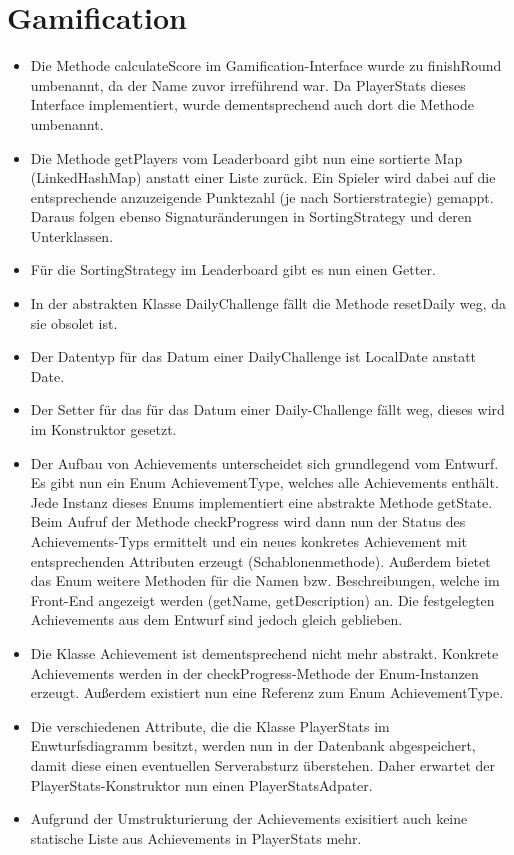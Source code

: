 \documentclass[a4paper]{scrreprt}
\begin{document}
\section{Gamification}
\begin{itemize}
  \item Die Methode calculateScore im Gamification-Interface wurde zu finishRound umbenannt, da der Name zuvor irreführend war. Da PlayerStats dieses Interface implementiert, wurde dementsprechend auch dort die Methode umbenannt.
  \item Die Methode getPlayers vom Leaderboard gibt nun eine sortierte Map (LinkedHashMap) anstatt einer Liste zurück. Ein Spieler wird dabei auf die entsprechende anzuzeigende Punktezahl (je nach Sortierstrategie) gemappt. Daraus folgen ebenso Signaturänderungen in SortingStrategy und deren Unterklassen.
  \item Für die SortingStrategy im Leaderboard gibt es nun einen Getter.
  \item In der abstrakten Klasse DailyChallenge fällt die Methode resetDaily weg, da sie obsolet ist.
  \item Der Datentyp für das Datum einer DailyChallenge ist LocalDate anstatt Date.
  \item Der Setter für das für das Datum einer Daily-Challenge fällt weg, dieses wird im Konstruktor gesetzt.
  \item Der Aufbau von Achievements unterscheidet sich grundlegend vom Entwurf. Es gibt nun ein Enum AchievementType, welches alle Achievements
    enthält. Jede Instanz dieses Enums implementiert eine abstrakte Methode getState. Beim Aufruf der Methode checkProgress
    wird dann nun der Status des Achievements-Typs ermittelt und ein neues konkretes Achievement mit entsprechenden Attributen
    erzeugt (Schablonenmethode). Außerdem bietet das Enum weitere Methoden für die Namen bzw. Beschreibungen, welche im Front-End
    angezeigt werden (getName, getDescription) an. Die festgelegten Achievements aus dem Entwurf sind jedoch gleich geblieben.
  \item Die Klasse Achievement ist dementsprechend nicht mehr abstrakt. Konkrete Achievements werden in der checkProgress-Methode
    der Enum-Instanzen erzeugt. Außerdem existiert nun eine Referenz zum Enum AchievementType.
  \item Die verschiedenen Attribute, die die Klasse PlayerStats im Enwturfsdiagramm besitzt, werden nun in der Datenbank abgespeichert, damit diese
    einen eventuellen Serverabsturz überstehen. Daher erwartet der PlayerStats-Konstruktor nun einen PlayerStatsAdpater.
  \item Aufgrund der Umstrukturierung der Achievements exisitiert auch keine statische Liste aus Achievements in PlayerStats mehr.
\end{itemize}
\end{document}
